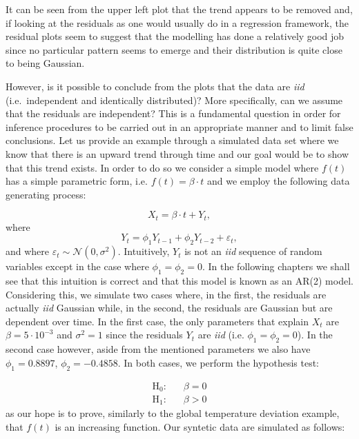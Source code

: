 \documentclass[]{book}
\theoremstyle{definition}
\theoremstyle{definition}
\theoremstyle{definition}
\theoremstyle{remark}
\begin{document}
It can be seen from the upper left plot that the trend appears to be
removed and, if looking at the residuals as one would usually do in a
regression framework, the residual plots seem to suggest that the
modelling has done a relatively good job since no particular pattern
seems to emerge and their distribution is quite close to being Gaussian.

However, is it possible to conclude from the plots that the data are
\emph{iid} (i.e.~independent and identically distributed)? More
specifically, can we assume that the residuals are independent? This is
a fundamental question in order for inference procedures to be carried
out in an appropriate manner and to limit false conclusions. Let us
provide an example through a simulated data set where we know that there
is an upward trend through time and our goal would be to show that this
trend exists. In order to do so we consider a simple model where
\(f(t)\) has a simple parametric form, i.e. \(f(t) = \beta \cdot t\) and
we employ the following data generating process:

\[X_t = \beta \cdot t + Y_t,\] where
\[Y_t = \phi_1 Y_{t-1} + \phi_2 Y_{t-2} + \varepsilon_t,\] and where
\(\varepsilon_t \sim \mathcal{N}(0, \sigma^2)\). Intuitively, \(Y_t\) is
not an \emph{iid} sequence of random variables except in the case where
\(\phi_1 = \phi_2 = 0\). In the following chapters we shall see that
this intuition is correct and that this model is known as an AR(2)
model. Considering this, we simulate two cases where, in the first, the
residuals are actually \emph{iid} Gaussian while, in the second, the
residuals are Gaussian but are dependent over time. In the first case,
the only parameters that explain \(X_t\) are \(\beta = 5 \cdot 10^{-3}\)
and \(\sigma^2 = 1\) since the residuals \(Y_t\) are \emph{iid} (i.e.
\(\phi_1 = \phi_2 = 0\)). In the second case however, aside from the
mentioned parameters we also have \(\phi_1 = 0.8897\),
\(\phi_2 = -0.4858\). In both cases, we perform the hypothesis test:

\[
\begin{aligned}
\text{H}_0:& \;\;\; \beta = 0\\
\text{H}_1:& \;\;\; \beta > 0
\end{aligned}
\] as our hope is to prove, similarly to the global temperature
deviation example, that \(f(t)\) is an increasing function. Our syntetic
data are simulated as follows:
\end{document}
